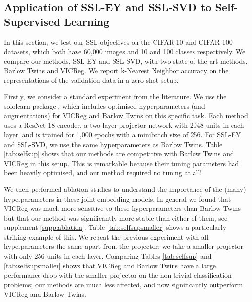 \subsection{Application of SSL-EY and SSL-SVD to Self-Supervised Learning}

In this section, we test our SSL objectives on the CIFAR-10 and CIFAR-100 datasets, which both have 60,000 images and 10 and 100 classes respectively. We compare our methods, SSL-EY and SSL-SVD, with two state-of-the-art methods, Barlow Twins and VICReg. We report k-Nearest Neighbor accuracy on the representations of the validation data in a zero-shot setup.

Firstly, we consider a standard experiment from the literature.
We use the sololearn package \cite{da2022solo}, which includes optimised hyperparameters (and augmentations) for VICReg and Barlow Twins on this specific task.
Each method uses a ResNet-18 encoder, a two-layer projector network with 2048 units in each layer, and is trained for 1,000 epochs with a minibatch size of 256.
For SSL-EY and SSL-SVD, we use the same hyperparameters as Barlow Twins.  
Table \ref{tab:selfsup} shows that our methods are competitive with Barlow Twins and VICReg in this setup.
This is remarkable because their tuning parameters had been heavily optimised, and our method required no tuning at all!

We then performed ablation studies to understand the importance of the (many) hyperparameters in these joint embedding models. In general we found that VICReg was much more sensitive to these hyperparameters than Barlow Twins but that our method was significantly more stable than either of them, see supplement \ref{supp:ablation}.
Table \ref{tab:selfsupsmaller} shows a particularly striking example of this. 
We repeat the previous experiment with all hyperparameters the same apart from the projector: we take a smaller projector with only 256 units in each layer. 
Comparing Tables \ref{tab:selfsup} and \ref{tab:selfsupsmaller} shows that VICReg and Barlow Twins have a large performance drop with the smaller projector on the non-trivial classification problems; our methods are much less affected, and now significantly outperform VICReg and Barlow Twins.
 


